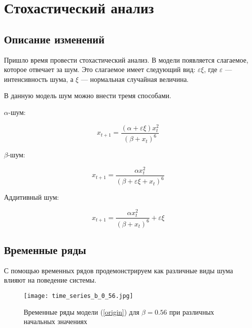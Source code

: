 \section{Стохастический анализ}

    \subsection{Описание изменений}

        Пришло время провести стохастический анализ. В модели появляется слагаемое, которое отвечает за шум. Это слагаемое имеет следующий вид: \(\varepsilon \xi\), где \(\varepsilon\) --- интенсивность шума, а \(\xi\) --- нормальная случайная величина.

        В данную модель шум можно внести тремя способами.

        \(\alpha\)-шум: 

        \[
            x_{t + 1} = \frac{(\alpha + \varepsilon \xi) x_t^2}{(\beta + x_t)^6}
        \]

        \(\beta\)-шум:

        \[
            x_{t + 1} = \frac{\alpha x_t^2}{(\beta + \varepsilon \xi + x_t)^6}
        \]

        Аддитивный шум:

        \[
            x_{t + 1} = \frac{\alpha x_t^2}{(\beta + x_t)^6} + \varepsilon \xi
        \]

    \subsection{Временные ряды}

        С помощью временных рядов продемонстрируем как различные виды шума влияют на поведение системы.

        \begin{figure}
            \centering
            \texttt{[image: time\_series\_b\_0\_56.jpg]}

            \captionsetup{justification=centering}
            \caption{Временные ряды модели (\ref{origin}) для \(\beta = 0.56\) при различных начальных значениях}
            \label{time_series_b_0_56}
        \end{figure}
